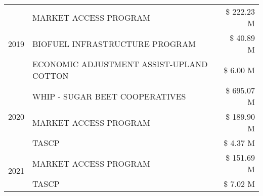 \begin{tabular}{llr}
\cline{1-3}
\multirow[t]{3}{*}{2019} & MARKET ACCESS PROGRAM & \$ 222.23 M \\
 & BIOFUEL INFRASTRUCTURE PROGRAM & \$ 40.89 M \\
 & ECONOMIC ADJUSTMENT ASSIST-UPLAND COTTON & \$ 6.00 M \\
\cline{1-3}
\multirow[t]{3}{*}{2020} & WHIP - SUGAR BEET COOPERATIVES & \$ 695.07 M \\
 & MARKET ACCESS PROGRAM & \$ 189.90 M \\
 & TASCP & \$ 4.37 M \\
\cline{1-3}
\multirow[t]{2}{*}{2021} & MARKET ACCESS PROGRAM & \$ 151.69 M \\
 & TASCP & \$ 7.02 M \\
\cline{1-3}
\bottomrule
\end{tabular}
